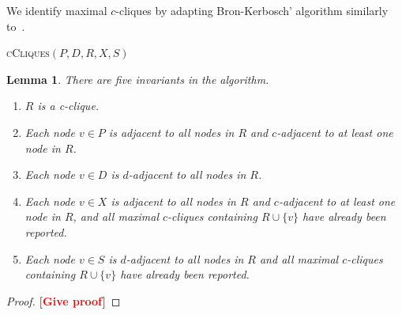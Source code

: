 \documentclass[11pt]{article}
\newcommand{\todo}[1]{\xspace{\bfseries\sffamily\textcolor{red}{[#1]}}\xspace}
\newtheorem{lemma}[theorem]{Lemma}
\begin{document}
We identify maximal $c$-cliques by adapting Bron-Kerbosch' algorithm similarly
to~\cite{Koch:1996fc,Koch:2001wi}.

\begin{algorithm2e}
  \caption{\textsc{cCliques}$(P,D,R,X,S)$}
  \label{alg:bk-pivot}
\end{algorithm2e}

\begin{lemma}
There are five invariants in the algorithm.
\begin{enumerate}
  \item $R$ is a c-clique.
  \item Each node $v \in P$ is adjacent to all nodes in $R$ and $c$-adjacent to
    at least one node in $R$.
  \item Each node $v \in D$ is $d$-adjacent to all nodes in $R$.
  \item Each node $v \in X$ is adjacent to all nodes in $R$ and $c$-adjacent to
    at least one node in $R$, and all maximal
    $c$-cliques containing $R \cup \{v\}$ have already been reported.
  \item Each node $v \in S$ is $d$-adjacent to all nodes in $R$ and all maximal
    $c$-cliques containing $R \cup \{v\}$ have already been reported.
\end{enumerate}
\end{lemma}
\begin{proof}
\todo{Give proof}
\end{proof}
\end{document}
